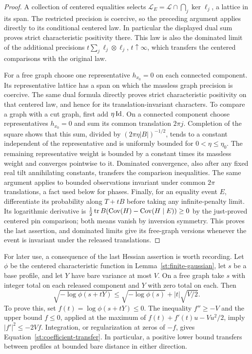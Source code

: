 \begin{proof}
A collection of centered equalities selects
$\mathcal L_E=\mathcal L\cap\bigcap_j\ker\ell_j$, a lattice in its span.
The restricted precision is coercive, so the preceding argument applies
directly to its conditional centered law. In particular the displayed dual
sum proves strict characteristic positivity there. This law is also the
dominated limit of the additional precisions
$t\sum_j\ell_j\otimes\ell_j$, $t\uparrow\infty$, which transfers the centered
comparisons with the original law.

For a free graph choose one representative $h_{x_0}=0$ on each connected
component. Its representative lattice has a span on which the massless graph
precision is coercive. The same dual formula directly proves strict
characteristic positivity on that centered law, and hence for its
translation-invariant characters. To compare a graph with a cut graph,
first add $\eta\operatorname{Id}$.
On a connected component choose representatives $h_{x_0}=0$ and sum its
common translation $2\pi j$. Completion of the square shows that this sum,
divided by $(2\pi\eta|B|)^{-1/2}$, tends to a constant independent of the
representative and is uniformly bounded for $0<\eta\le\eta_0$.
The remaining representative weight is bounded by a constant times its
massless weight and converges pointwise to it. Dominated convergence,
also after any fixed real tilt annihilating constants, transfers the
comparison inequalities.
The same argument applies to bounded observations invariant under common
$2\pi$ translations, a fact used below for phases.
Finally, for an equality event $E$, differentiate its probability along
$T+tB$ before taking any infinite-penalty limit. Its logarithmic derivative
is $\frac12\operatorname{tr} B(\operatorname{Cov}(H)-\operatorname{Cov}(H\mid E))\ge0$ by the just-proved centered
pin comparison; both means vanish by inversion symmetry. This proves the
last assertion, and dominated limits give its free-graph versions whenever
the event is invariant under the released translations.
\end{proof}

For later use, a consequence of the last Hessian assertion is worth recording.
Let $\phi$ be the centered characteristic function in
Lemma~\ref{st:finite-gaussian}, let $s$ be a base profile, and let $Y$ have
bare variance at most $V$. On a free graph take $s$ with integer total on
each released component and $Y$ with zero total on each. Then
\begin{equation}\label{st:coefficient-transfer}
 \sqrt{-\log\phi(s+tY)}
 \le\sqrt{-\log\phi(s)}+|t|\sqrt{V/2}.
\end{equation}
To prove this, set $f(t)=\log\phi(s+tY)\le0$. The inequality $f''\ge-V$
and the upper bound $f\le0$, applied at the maximum of
$f(t)+f'(t)u-Vu^2/2$, imply $|f'|^2\le-2Vf$.
Integration, or regularization at zeros of $-f$, gives
Equation~\eqref{st:coefficient-transfer}. In particular, a positive lower
bound transfers between profiles at bounded bare distance in either direction.

